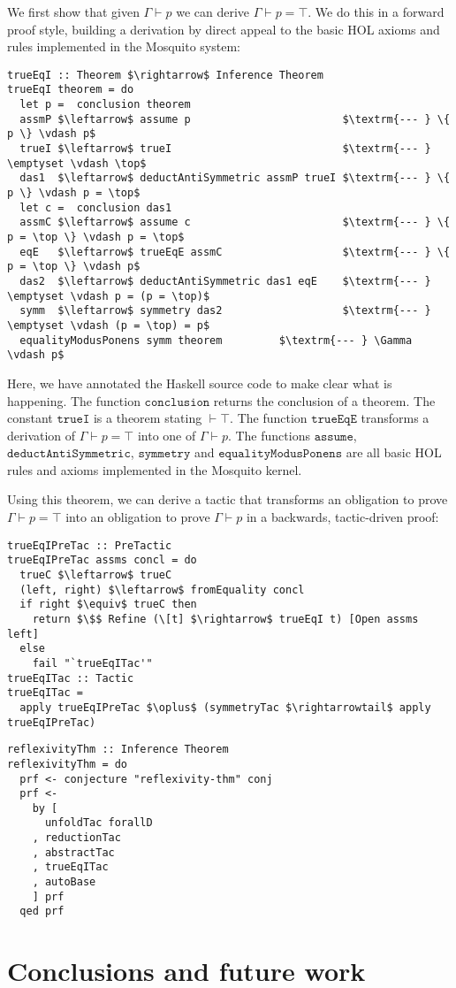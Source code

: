 \documentclass{llncs}
\newcommand{\mosquito}{Mosquito\xspace}
\begin{document}
We first show that given $\Gamma \vdash p$ we can derive $\Gamma \vdash p = \top$.
We do this in a forward proof style, building a derivation by direct appeal to the basic HOL axioms and rules implemented in the \mosquito system:
\begin{lstlisting}
trueEqI :: Theorem $\rightarrow$ Inference Theorem
trueEqI theorem = do
  let p =  conclusion theorem
  assmP $\leftarrow$ assume p                        $\textrm{--- } \{ p \} \vdash p$
  trueI $\leftarrow$ trueI                           $\textrm{--- } \emptyset \vdash \top$
  das1  $\leftarrow$ deductAntiSymmetric assmP trueI $\textrm{--- } \{ p \} \vdash p = \top$
  let c =  conclusion das1
  assmC $\leftarrow$ assume c                        $\textrm{--- } \{ p = \top \} \vdash p = \top$
  eqE   $\leftarrow$ trueEqE assmC                   $\textrm{--- } \{ p = \top \} \vdash p$
  das2  $\leftarrow$ deductAntiSymmetric das1 eqE    $\textrm{--- } \emptyset \vdash p = (p = \top)$
  symm  $\leftarrow$ symmetry das2                   $\textrm{--- } \emptyset \vdash (p = \top) = p$
  equalityModusPonens symm theorem         $\textrm{--- } \Gamma \vdash p$
\end{lstlisting}
Here, we have annotated the Haskell source code to make clear what is happening.
The function $\mathtt{conclusion}$ returns the conclusion of a theorem.
The constant $\mathtt{trueI}$ is a theorem stating $\vdash \top$.
The function $\mathtt{trueEqE}$ transforms a derivation of $\Gamma \vdash p = \top$ into one of $\Gamma \vdash p$.
The functions $\mathtt{assume}$, $\mathtt{deductAntiSymmetric}$, $\mathtt{symmetry}$ and $\mathtt{equalityModusPonens}$ are all basic HOL rules and axioms implemented in the \mosquito kernel.

Using this theorem, we can derive a tactic that transforms an obligation to prove $\Gamma \vdash p = \top$ into an obligation to prove $\Gamma \vdash p$ in a backwards, tactic-driven proof:
\begin{lstlisting}
trueEqIPreTac :: PreTactic
trueEqIPreTac assms concl = do
  trueC $\leftarrow$ trueC
  (left, right) $\leftarrow$ fromEquality concl
  if right $\equiv$ trueC then
    return $\$$ Refine (\[t] $\rightarrow$ trueEqI t) [Open assms left]
  else
    fail "`trueEqITac'"
trueEqITac :: Tactic
trueEqITac =
  apply trueEqIPreTac $\oplus$ (symmetryTac $\rightarrowtail$ apply trueEqIPreTac)
\end{lstlisting}

\begin{lstlisting}
reflexivityThm :: Inference Theorem
reflexivityThm = do
  prf <- conjecture "reflexivity-thm" conj
  prf <-
    by [
      unfoldTac forallD
    , reductionTac
    , abstractTac
    , trueEqITac
    , autoBase
    ] prf
  qed prf
\end{lstlisting}

\section{Conclusions and future work}
\label{sect.conclusions}


\end{document}
